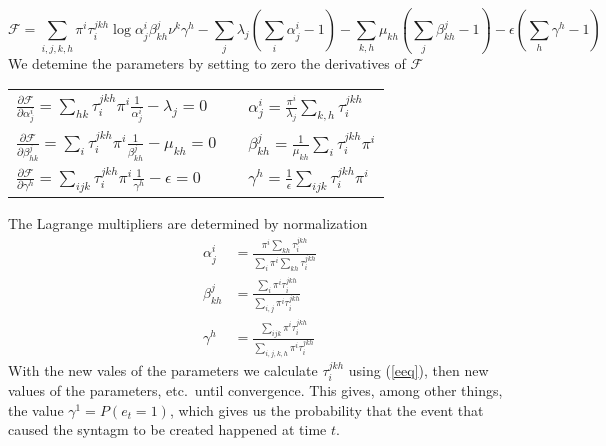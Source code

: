 \documentclass[10pt]{article}
\def\ev{e}
\begin{document}
%
%
\begin{equation}
  {\mathcal{F}} = \sum_{i,j,k,h} \pi^i \tau_i^{jkh} \log \alpha_j^i \beta_{kh}^j \nu^k \gamma^h 
  - \sum_j \lambda_j \left(\sum_i \alpha_j^i - 1\right) 
  - \sum_{k,h} \mu_{kh} \left( \sum_j \beta_{kh}^j - 1 \right) 
  - \epsilon \left( \sum_h \gamma^h - 1\right)
\end{equation}
%
%
We detemine the parameters by setting to zero the derivatives of
${\mathcal{F}}$
%
%
\begin{center}
  \begin{tabular}{lcl}
  $\displaystyle \frac{\partial {\mathcal{F}}}{\partial \alpha_j^i} = 
    \sum_{hk} \tau_i^{jkh} \pi^i \frac{1}{\alpha_j^i} - \lambda_j = 0$
    &  \rule{5em}{0pt} & 
    $\displaystyle \alpha_j^i = \frac{\pi^i}{\lambda_j} \sum_{k,h} \tau_i^{jkh}$ \\
    $\displaystyle \frac{\partial {\mathcal{F}}}{\partial \beta_{hk}^j} = 
    \sum_i \tau_i^{jkh} \pi^i \frac{1}{\beta_{kh}^j} - \mu_{kh} = 0$
    &  &
    $\displaystyle \beta_{kh}^j = \frac{1}{\mu_{kh}} \sum_i \tau_i^{jkh} \pi^i$ \\
    $\displaystyle \frac{\partial {\mathcal{F}}}{\partial \gamma^h} = 
    \sum_{ijk} \tau_i^{jkh} \pi^i \frac{1}{\gamma^h} - \epsilon = 0$
    & &
    $\displaystyle \gamma^h = \frac{1}{\epsilon} \sum_{ijk} \tau_i^{jkh} \pi^i$
  \end{tabular}
\end{center}

The Lagrange multipliers are determined by normalization
%
%
\begin{equation}
  \begin{aligned}
    \alpha_j^i &= \frac{\displaystyle \pi^i \sum_{kh} \tau_i^{jkh}}{\displaystyle \sum_i \pi^i \sum_{kh} \tau_i^{jkh}} \\
    \beta_{kh}^j &= \frac{\displaystyle \sum_i \pi^i \tau_i^{jkh}}{\displaystyle \sum_{i,j} \pi^i \tau_i^{jkh}} \\
    \gamma^h &= \frac{\displaystyle \sum_{ijk} \pi^i \tau_i^{jkh}}{\displaystyle \sum_{i,j,k,h} \pi^i \tau_i^{jkh}} 
  \end{aligned}
\end{equation}
%
%
With the new vales of the parameters we calculate $\tau_i^{jkh}$ using
(\ref{eeq}), then new values of the parameters, etc.\ until
convergence. This gives, among other things, the value
$\gamma^1=P(\ev_t=1)$, which gives us the probability that the event
that caused the syntagm to be created happened at time $t$. 
\end{document}
